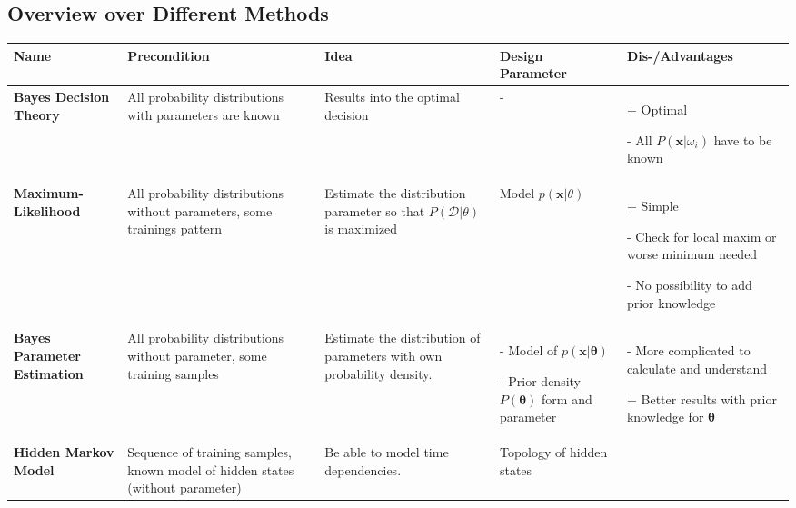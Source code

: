 \newpage
\begin{landscape}
\section{Overview over Different Methods}
\begin{tabular}{| p{3cm} |  p{3.5cm} | p{5cm} | p{4cm} | p{8cm} |}
\hline
Name& 	Precondition & Idea & Design Parameter & Dis-/Advantages\\
\hline
\textbf{Bayes Decision Theory} &
	All  probability distributions with parameters are known &
	Results into the optimal decision &
	- &
	\begin{beschreibListe}
	\item[+] Optimal
	\item[-] All $P(\bm x | \omega_i)$ have to be known
	\end{beschreibListe}	\\
\hline
\textbf{Maximum-Likelihood} &
	All probability distributions without parameters, some trainings pattern &
	Estimate the distribution parameter so that $P(\mathcal D|\theta)$ is maximized&
	Model $p(\bm x | \theta)$ &
	\begin{beschreibListe}
	\item[+] Simple
	\item[-] Check for local maxim or worse minimum needed
	\item[-] No possibility to add prior knowledge
	\end{beschreibListe}\\
\hline
\textbf{Bayes Parameter Estimation} &
	All probability distributions without parameter, some training samples &
	Estimate the distribution of parameters with own probability density.   &
	\begin{beschreibListe}
	\item[-] Model of $p(\bm x|\bm \theta)$
	\item[-] Prior density $P(\bm \theta)$ form and parameter 
	\end{beschreibListe} &
	\begin{beschreibListe}
	\item[-] More complicated to calculate and understand
	\item[+] Better results with prior knowledge for $\bm \theta$
	\end{beschreibListe}\\
\hline
\textbf{Hidden Markov Model} &
	Sequence of training samples, known model of hidden states (without parameter) &
	Be able to model time dependencies. &
	Topology of hidden states &
	

\end{tabular}
\end{landscape}

